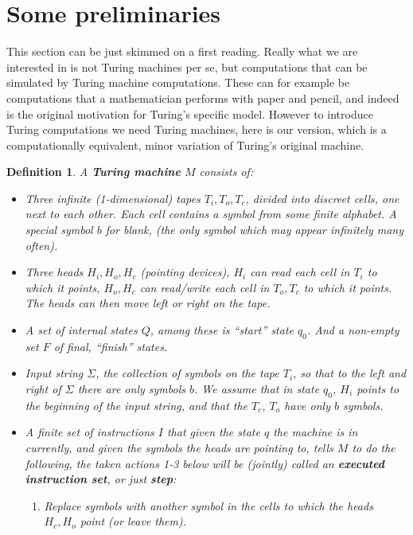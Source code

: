 \documentclass[9pt,twocolumn,twoside,lineno]{pnas-new}
\numberwithin{equation}{section}
\newtheorem{definition}[equation]{Definition}
\theoremstyle{definition}
\theoremstyle{remark}
\begin{document}
\section {Some preliminaries} \label{sec:prelims}
This section can be just skimmed on a first reading.
Really what we are interested in is not Turing machines per se, but computations that can be simulated by Turing machine computations. These can for example be computations that a mathematician performs with paper and pencil, and indeed is the original motivation for Turing's specific model. However to introduce Turing computations we need Turing machines, here is our version, which is a computationally equivalent, minor variation of Turing's original machine.
\begin{definition} \label{def:Machine} A \textbf{\emph{Turing machine}} $M$ consists of:
  \begin{itemize} 
     \item Three infinite (1-dimensional) tapes $T _{i}, T _{o}, T _{c}   $, divided into discreet cells, one next to each other. Each cell contains a symbol from some finite alphabet. A special symbol $b$ for blank, (the only symbol which may appear infinitely many often).
     \item Three  heads $H _{i}, H _{o}, H _{c}   $ (pointing devices),  $H _{i} $ can read each cell in $T _{i} $ to which it points, $H _{o}, H _{c}  $ can read/write each cell in $T _{o}, T _{c}  $ to which it points.
        The heads can then move left or right on the tape.
     \item A set of internal states $Q$, among these is ``start'' state $q _{0} $. And a non-empty set $F$ of final, ``finish'' states.
\item Input string $\Sigma$, the collection of symbols on the tape $T _{i} $, so that to the left and right of $\Sigma$ there are only symbols $b$. We assume that in state $q _{0} $, $H _{i} $ points to the beginning of the input string, and that the $T _{c} $, $T _{o} $ have only $b$ symbols.
\item A finite set of instructions $I$ that given the state $q$ the machine is in currently, and given the symbols the heads are pointing to, tells $M$ to do the following, the taken actions 1-3 below will be (jointly) called an \textbf{\emph{executed instruction set}}, or just \textbf{\emph{step}}:
\begin{enumerate} \label{enumerate}
   \item Replace symbols with another symbol in the cells to which the heads $H _{c}, H _{o}  $ point (or leave them).

\end{enumerate}
\end{itemize}
\end{definition}
\end{document}
